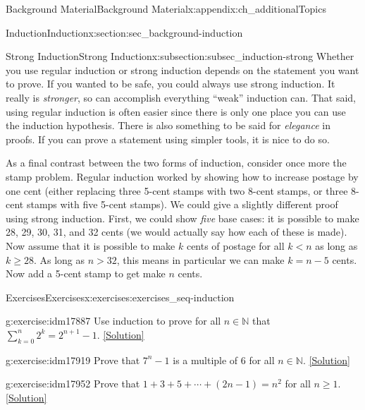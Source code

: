 \documentclass[oneside,10pt,]{book}
\numberwithin{equation}{chapter}
\def\d{\displaystyle}
\def\N{\mathbb N}
\newcommand{\lt}{<}
\begin{document}
\begin{appendixptx}{Background Material}{}{Background Material}{}{}{x:appendix:ch_additionalTopics}
\begin{sectionptx}{Induction}{}{Induction}{}{}{x:section:sec_background-induction}
\begin{subsectionptx}{Strong Induction}{}{Strong Induction}{}{}{x:subsection:subsec_induction-strong}
Whether you use regular induction or strong induction depends on the statement you want to prove. If you wanted to be safe, you could always use strong induction. It really is \emph{stronger}, so can accomplish everything ``weak'' induction can. That said, using regular induction is often easier since there is only one place you can use the induction hypothesis. There is also something to be said for \emph{elegance} in proofs. If you can prove a statement using simpler tools, it is nice to do so.%
\par
As a final contrast between the two forms of induction, consider once more the stamp problem. Regular induction worked by showing how to increase postage by one cent (either replacing three 5-cent stamps with two 8-cent stamps, or three 8-cent stamps with five 5-cent stamps). We could give a slightly different proof using strong induction. First, we could show \emph{five} base cases: it is possible to make 28, 29, 30, 31, and 32 cents (we would actually say how each of these is made). Now assume that it is possible to make \(k\) cents of postage for all \(k \lt  n\) as long as \(k \ge 28\). As long as \(n > 32\), this means in particular we can make \(k = n-5\) cents. Now add a 5-cent stamp to get make \(n\) cents.%
\end{subsectionptx}
%
%
\typeout{************************************************}
\typeout{************************************************}
%
\begin{exercises-subsection}{Exercises}{}{Exercises}{}{}{x:exercises:exercises_seq-induction}
\begin{divisionexercise}{1}{}{}{g:exercise:idm17887}%
Use induction to prove for all \(n \in \N\) that \(\d\sum_{k=0}^n 2^k = 2^{n+1} - 1\).%
\space\hspace*{0pt}\hfill{\tiny\hyperlink{g:solution:idm17892-main}{[Solution]}}\end{divisionexercise}%
\begin{divisionexercise}{2}{}{}{g:exercise:idm17919}%
Prove that \(7^n - 1\) is a multiple of 6 for all \(n \in \N\).%
\space\hspace*{0pt}\hfill{\tiny\hyperlink{g:solution:idm17924-main}{[Solution]}}\end{divisionexercise}%
\begin{divisionexercise}{3}{}{}{g:exercise:idm17952}%
Prove that \(1 + 3 + 5 + \cdots + (2n-1) = n^2\) for all \(n \ge 1\).%
\space\hspace*{0pt}\hfill{\tiny\hyperlink{g:solution:idm17957-main}{[Solution]}}\end{divisionexercise}%

\end{exercises-subsection}
\end{sectionptx}
\end{appendixptx}
\end{document}
